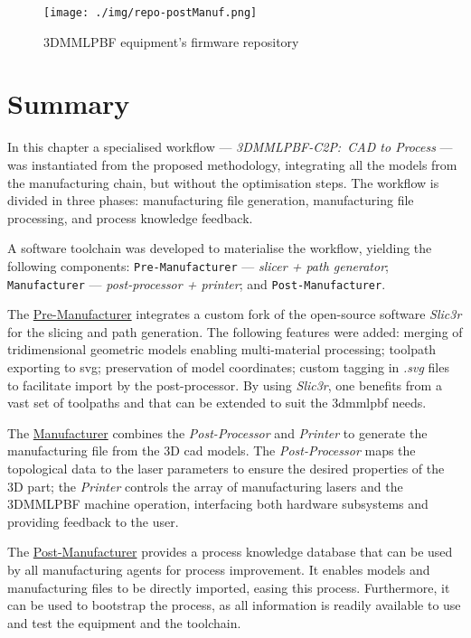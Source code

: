 \begin{figure}[!hbt]
  \centering
    \texttt{[image: ./img/repo-postManuf.png]}
    \caption{3DMMLPBF equipment's firmware repository~\cite{repoFirmware}}%
    \label{fig:repoFirmware}
\end{figure}

\section{Summary}
In this chapter a specialised workflow --- \emph{3DMMLPBF-C2P:~CAD to Process} --- was
instantiated from the proposed methodology, integrating all the models from the
manufacturing chain, but without the optimisation
steps. The workflow is divided in three phases: manufacturing file
generation, manufacturing file processing, and process knowledge feedback.

A software toolchain was developed to materialise the workflow, yielding the
following components: \texttt{Pre-Manufacturer} --- \emph{slicer + path generator};
\texttt{Manufacturer} --- \emph{post-processor + printer}; and \texttt{Post-Manufacturer}.

The \underline{Pre-Manufacturer} integrates a custom fork of the open-source
software \emph{Slic3r} for the slicing and path generation. The following
features were added: merging of
tridimensional geometric models enabling multi-material processing; toolpath
exporting to \gls{svg}; preservation of model coordinates; custom tagging in
\emph{.svg} files to facilitate import by the post-processor.
By using \emph{Slic3r}, one benefits from a vast set of toolpaths and that can
be extended to suit the \gls{3dmmlpbf} needs.

The \underline{Manufacturer} combines the \emph{Post-Processor} and \emph{Printer}
to generate the manufacturing file from the 3D \gls{cad} models.
The \emph{Post-Processor} maps the topological data to the laser parameters to ensure
the desired properties of the 3D part; the \emph{Printer} controls the array of
manufacturing lasers and the 3DMMLPBF
machine operation, interfacing both hardware subsystems and providing feedback
to the user.

The \underline{Post-Manufacturer} provides a process knowledge database that can be
used by all manufacturing agents for process improvement. It enables models and
manufacturing files to be directly imported, easing this process. Furthermore,
it can be used to bootstrap the process, as all information is readily available
to use and test the equipment and the toolchain.

